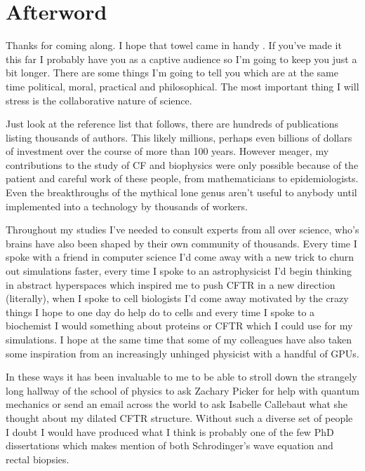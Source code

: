 \chapter{Afterword}
\label{chap:Afterword}
\chapquote {}{}

 Thanks for coming along. I hope that towel came in handy \cite{adamd1979}. If you've made it this far I probably have you as a captive audience so I'm going to keep you just a bit longer. There are some things I'm going to tell you which are at the same time political, moral, practical and philosophical. The most important thing I will stress is the collaborative nature of science.

Just look at the reference list that follows, there are hundreds of publications listing thousands of authors. This likely millions, perhaps even billions of dollars of investment over the course of more than 100 years. However meager, my contributions to the study of CF and biophysics were only possible because of the patient and careful work of these people, from mathematicians to epidemiologists. Even the breakthroughs of the mythical lone genus aren't useful to anybody until implemented into a technology by thousands of workers. 

Throughout my studies I've needed to consult experts from all over science, who's brains have also been shaped by their own community of thousands. Every time I spoke with a friend in computer science I'd come away with a new trick to churn out simulations faster, every time I spoke to an astrophysicist I'd begin thinking in abstract hyperspaces which inspired me to push CFTR in a new direction (literally), when I spoke to cell biologists I'd come away motivated by the crazy things I hope to one day do help do to cells and every time I spoke to a biochemist I would something about proteins or CFTR which I could use for my simulations. I hope at the same time that some of my colleagues have also taken some inspiration from an increasingly unhinged physicist with a handful of GPUs. 

In these ways it has been invaluable to me to be able to stroll down the strangely long hallway of the school of physics to ask Zachary Picker for help with quantum mechanics or send an email across the world to ask Isabelle Callebaut what she thought about my dilated CFTR structure. Without such a diverse set of people I doubt I would have produced what I think is probably one of the few PhD dissertations which makes mention of both Schrodinger's wave equation and rectal biopsies. 

